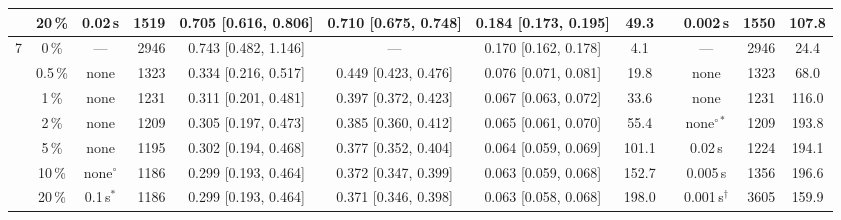 \begin{tabular}{@{}cccrccccccrc@{}}
 & 20\,\% & 0.02\,s & 1519 & 0.705 [0.616, 0.806] & 0.710 [0.675, 0.748] & 0.184 [0.173, 0.195] & 49.3 &  & 0.002\,s & 1550 & 107.8 \\
\midrule
7 & 0\,\% & --- & 2946 & 0.743 [0.482, 1.146] & --- & 0.170 [0.162, 0.178] & 4.1 &  & --- & 2946 & 24.4 \\
 & 0.5\,\% & none & 1323 & 0.334 [0.216, 0.517] & 0.449 [0.423, 0.476] & 0.076 [0.071, 0.081] & 19.8 &  & none & 1323 & 68.0 \\
 & 1\,\% & none & 1231 & 0.311 [0.201, 0.481] & 0.397 [0.372, 0.423] & 0.067 [0.063, 0.072] & 33.6 &  & none & 1231 & 116.0 \\
 & 2\,\% & none & 1209 & 0.305 [0.197, 0.473] & 0.385 [0.360, 0.412] & 0.065 [0.061, 0.070] & 55.4 &  & none$^{\circ\ast}$ & 1209 & 193.8 \\
 & 5\,\% & none & 1195 & 0.302 [0.194, 0.468] & 0.377 [0.352, 0.404] & 0.064 [0.059, 0.069] & 101.1 &  & 0.02\,s & 1224 & 194.1 \\
 & 10\,\% & none$^{\circ}$ & 1186 & 0.299 [0.193, 0.464] & 0.372 [0.347, 0.399] & 0.063 [0.059, 0.068] & 152.7 &  & 0.005\,s & 1356 & 196.6 \\
 & 20\,\% & 0.1\,s$^{\ast}$ & 1186 & 0.299 [0.193, 0.464] & 0.371 [0.346, 0.398] & 0.063 [0.058, 0.068] & 198.0 &  & 0.001\,s$^{\dagger}$ & 3605 & 159.9 \\
\bottomrule
\end{tabular}
